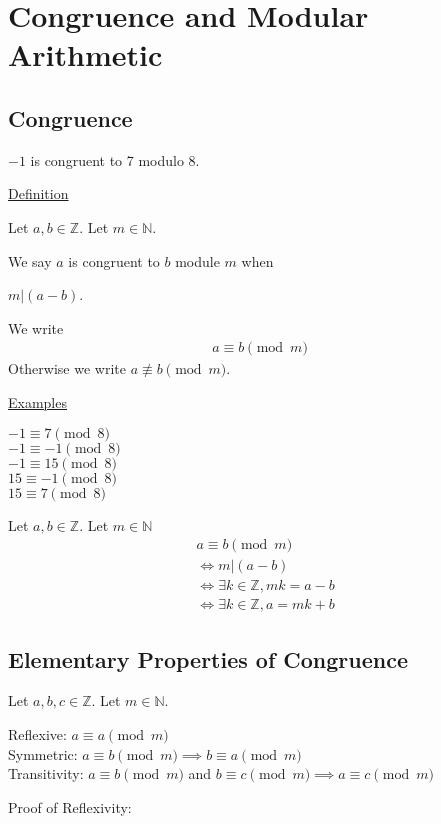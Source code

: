 \documentclass{article}
\begin{document}
\section{Congruence and Modular Arithmetic}

\subsection{Congruence}

$-1$ is congruent to 7 modulo 8. 

\underline{Definition}

Let $a,b \in \mathbb{Z}$. Let $m \in \mathbb{N}$.

We say $a$ is congruent to $b$ module $m$ when

$m \vert (a-b)$.

We write 
\begin{align*}
    a \equiv b \pmod{m}
\end{align*}
Otherwise we write $a \not\equiv b \pmod{m}$. 

\underline{Examples}

$-1 \equiv 7 \pmod{8}$\\
$-1 \equiv -1 \pmod{8}$\\
$-1 \equiv 15 \pmod{8}$\\
$15 \equiv -1 \pmod{8}$\\
$15 \equiv 7 \pmod{8}$

Let $a,b \in \mathbb{Z}$. Let $m \in \mathbb{N}$
\begin{align*}
    &a \equiv b \pmod{m}\\
    &\iff m \vert (a - b)\\
    &\iff \exists k \in \mathbb{Z}, mk = a-b\\
    &\iff \exists k \in \mathbb{Z}, a = mk + b
\end{align*}

\subsection{Elementary Properties of Congruence}

Let $a,b,c \in \mathbb{Z}$. Let $m \in \mathbb{N}$.

Reflexive: $a \equiv a \pmod{m}$\\
Symmetric: $a \equiv b \pmod{m} \implies b \equiv a \pmod{m}$\\
Transitivity: $a \equiv b \pmod{m}$ and $b \equiv c \pmod{m} \implies a \equiv c \pmod{m}$

Proof of Reflexivity:
\end{document}
